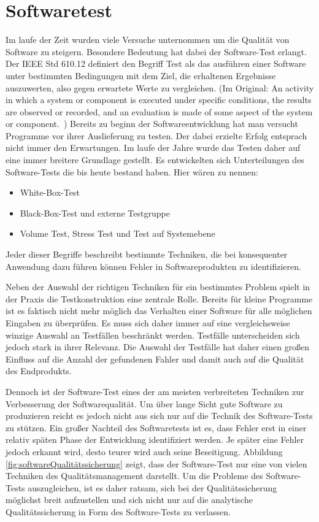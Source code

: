 \section{Softwaretest}
\label{sec:softwaretest}
Im laufe der Zeit wurden viele Versuche unternommen um die Qualität von Software zu steigern. Besondere Bedeutung hat dabei der Software-Test erlangt.
Der IEEE Std 610.12 definiert den Begriff Test als das ausführen einer Software unter bestimmten Bedingungen mit dem Ziel, die erhaltenen Ergebnisse auszuwerten, also gegen erwartete Werte zu vergleichen.
(Im Original: \glqq An activity in which a system or component is executed under specific conditions, the results are observed or recorded, and an evaluation is made of some aspect of the system or component.\grqq\ \cite{ieee_ieee_1991})
Bereits zu beginn der Softwareentwicklung hat man versucht Programme vor ihrer Auslieferung zu testen. Der dabei erzielte Erfolg entsprach nicht immer den Erwartungen. Im laufe der Jahre wurde das Testen daher auf eine immer breitere Grundlage gestellt. Es entwickelten sich Unterteilungen des Software-Tests die bis heute bestand haben. Hier wären zu nennen:
\begin{itemize}
\item White-Box-Test
\item Black-Box-Test und externe Testgruppe
\item Volume Test, Stress Test und Test auf Systemebene
\end{itemize}
Jeder dieser Begriffe beschreibt bestimmte Techniken, die bei konsequenter Anwendung dazu führen können Fehler in Softwareprodukten zu identifizieren. \cite[vgl. S.18]{thaller_software-test_2002}

Neben der Auswahl der richtigen Techniken für ein bestimmtes Problem spielt in der Praxis die Testkonstruktion eine zentrale Rolle. Bereits für kleine Programme ist es faktisch nicht mehr möglich das Verhalten einer Software für alle möglichen Eingaben zu überprüfen. Es muss sich daher immer auf eine vergleichsweise winzige Auswahl an Testfällen beschränkt werden. Testfälle unterscheiden sich jedoch stark in ihrer Relevanz. Die Auswahl der Testfälle hat daher einen großen Einfluss auf die Anzahl der gefundenen Fahler und damit auch auf die Qualität des Endprodukts. \cite[vgl. S.22]{hoffmann_software-qualitat_2013}

Dennoch ist der Software-Test eines der am meisten verbreiteten Techniken zur Verbesserung der Softwarequalität. Um über lange Sicht gute Software zu produzieren reicht es jedoch nicht aus sich nur auf die Technik des Software-Tests zu stützen. Ein großer Nachteil des Softwaretests ist es, dass Fehler erst in einer relativ späten Phase der Entwicklung identifiziert werden. Je später eine Fehler jedoch erkannt wird, desto teurer wird auch seine Beseitigung. Abbildung \ref{fig:softwareQualitätssicherung} zeigt, dass der Software-Test nur eine von vielen Techniken des Qualitätsmanagement darstellt. Um die Probleme des Software-Tests auszugleichen, ist es daher ratsam, sich bei der Qualitätssicherung möglichst breit aufzustellen und sich nicht nur auf die analytische Qualitätssicherung in Form des Software-Tests zu verlassen. \cite[vgl. S.18]{thaller_software-test_2002}


